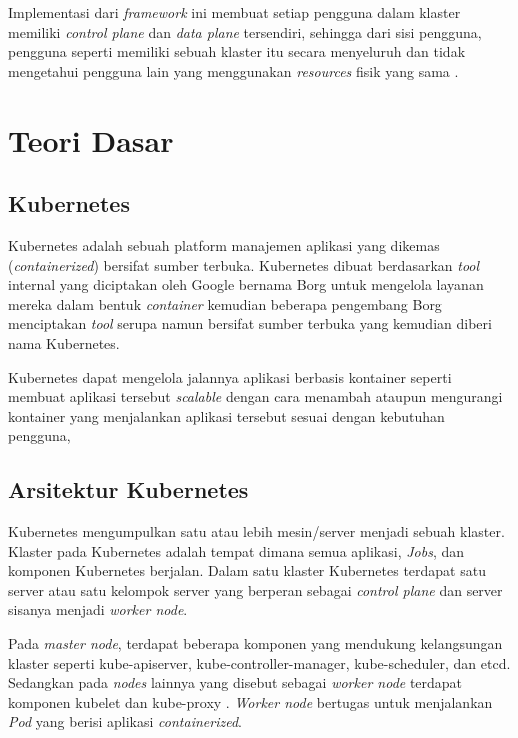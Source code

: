 Implementasi dari \emph{framework} ini membuat setiap pengguna dalam klaster
memiliki \emph{control plane} dan \emph{data plane} tersendiri, sehingga dari
sisi pengguna, pengguna seperti memiliki sebuah klaster itu secara menyeluruh
dan tidak mengetahui pengguna lain yang menggunakan \emph{resources} fisik yang sama
\parencite{9546524}.

\section{Teori Dasar}

\subsection{Kubernetes}

Kubernetes adalah sebuah platform manajemen aplikasi yang dikemas (\emph{containerized})
bersifat sumber terbuka. Kubernetes dibuat berdasarkan \emph{tool} internal
yang diciptakan oleh Google bernama Borg untuk mengelola layanan mereka dalam bentuk
\emph{container} \parencite{43438} kemudian beberapa pengembang Borg menciptakan
\emph{tool} serupa namun bersifat sumber terbuka yang kemudian diberi nama Kubernetes.

Kubernetes dapat mengelola jalannya aplikasi berbasis kontainer seperti membuat
aplikasi tersebut \emph{scalable} dengan cara menambah ataupun mengurangi kontainer
yang menjalankan aplikasi tersebut sesuai dengan kebutuhan pengguna, 

\subsection{Arsitektur Kubernetes}

Kubernetes mengumpulkan satu atau lebih mesin/server menjadi sebuah klaster. Klaster
pada Kubernetes adalah tempat dimana semua aplikasi, \emph{Jobs}, dan komponen Kubernetes
berjalan. Dalam satu klaster Kubernetes terdapat satu server atau satu kelompok server
yang berperan sebagai \emph{control plane} dan server sisanya menjadi \emph{worker node}.

Pada \emph{master node}, terdapat beberapa komponen yang mendukung kelangsungan
klaster seperti kube-apiserver, kube-controller-manager, kube-scheduler, dan etcd.
Sedangkan pada \emph{nodes} lainnya yang disebut sebagai \emph{worker node}
terdapat komponen kubelet dan kube-proxy \parencite{kubernetes-website-components}.
\emph{Worker node} bertugas untuk menjalankan \emph{Pod} yang berisi aplikasi
\emph{containerized}.

